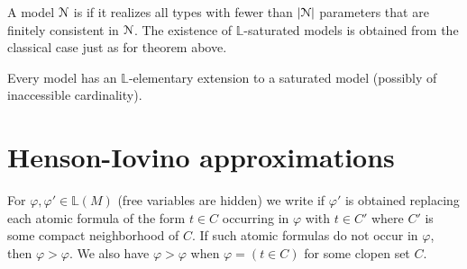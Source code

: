 \documentclass[11pt,oneside]{amsart}
\newcommand{\mylabel}[1]{{#1}\hfill}
\renewenvironment{itemize}
  {\begin{list}{$\cdot$}{%
  \setlength{\parskip}{0mm}
  \setlength{\topsep}{.2\baselineskip}
  \setlength{\rightmargin}{0mm}
  \setlength{\listparindent}{0mm}
  \setlength{\itemindent}{0mm}
  \setlength{\labelwidth}{3ex}
  \setlength{\itemsep}{.2\baselineskip}
  \setlength{\parsep}{.2\baselineskip}
  \setlength{\partopsep}{0mm}
  \setlength{\labelsep}{1ex}
  \setlength{\leftmargin}{\labelwidth+\labelsep}
  \let\makelabel\mylabel}}{%
\end{list}}
\renewcommand*{\emph}[1]{%
   \smash{\tikz[baseline]\node[rectangle, fill=teal!25, rounded corners, inner xsep=0.5ex, inner ysep=0.2ex, anchor=base, minimum height = 2.7ex]{#1};}}
\begin{document}


A model ${\EuScript N}$ is \emph{$\mathds{L}$-saturated\/} if it realizes all types with fewer than $|{\EuScript N}|$ parameters that are finitely consistent in ${\EuScript N}$.
The existence of $\mathds{L}$-saturated models is obtained from the classical case just as for theorem above.

\begin{proposition}
  Every model has an $\mathds{L}$-elementary extension to a saturated model (possibly of inaccessible cardinality).
\end{proposition}







\section{Henson-Iovino approximations}\label{ultrapws}


For $\varphi,\varphi'\in\mathds{L}(M)$ (free variables are hidden) we write \emph{$\varphi'>\varphi$\/} if $\varphi'$ is obtained replacing each atomic formula of the form $t\in C$ occurring in $\varphi$ with $t\in C'$ where $C'$ is some compact neighborhood of $C$.
If such atomic formulas do not occur in $\varphi$, then $\varphi>\varphi$.
We also have $\varphi>\varphi$ when $\varphi=(t\in C)$ for some clopen set $C$.
\end{document}
